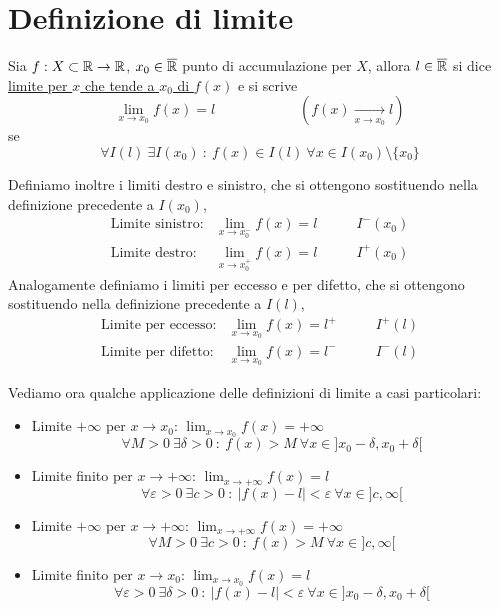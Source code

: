 \section{Definizione di limite}
\begin{boxdef}
    Sia $f:X\subset\mathbb{R}\to \mathbb{R}$, $x_0\in \overline{\mathbb{R}}$ punto di accumulazione per $X$, allora $l\in \overline{\mathbb{R}}$ si dice \underline{limite per $x$ che tende a $x_0$ di $f(x)$} e si scrive
    \[\lim_{x\to x_0}f(x) = l\qquad\qquad\qquad \left(f(x)\underset{x\to x_0}{\xrightarrow{\hspace{1cm}}}l\right)\]
    se
    \[\forall I(l)\ \exists I(x_0) \ :\ f(x)\in I(l)\ \forall x \in I(x_0)\setminus \{x_0\}\]
\end{boxdef}
Definiamo inoltre i limiti destro e sinistro, che si ottengono sostituendo nella definizione precedente a $I(x_0)$, 
\[\begin{array}{lll}
    \text{Limite sinistro:} & \lim_{x \to x_0^-}f(x) = l \qquad &I^-(x_0)\\
    \text{Limite destro:} & \lim_{x \to x_0^+}f(x) = l & I^ +(x_0)
\end{array}\]
Analogamente definiamo i limiti per eccesso e per difetto, che si ottengono sostituendo nella definizione precedente a $I(l)$, 
\[\begin{array}{lll}
    \text{Limite per eccesso:} & \lim_{x \to x_0}f(x) = l^+\qquad &I^ + (l)\\
    \text{Limite per difetto:} & \lim_{x \to x_0}f(x) = l^-  & I^ - (l)
\end{array}\]

Vediamo ora qualche applicazione delle definizioni di limite a casi particolari:
\begin{itemize}
    \item Limite $+\infty$ per $x\to x_0$: $\lim_{x\to x_0}f(x)=+\infty$
    \[\forall M > 0\ \exists \delta > 0\ :\ f(x) > M\ \forall x \in ] x_0 -\delta, x_0 +\delta[\]
    \item Limite finito per $x\to +\infty$: $\lim_{x\to +\infty}f(x)=l$
    \[\forall \varepsilon > 0\ \exists c > 0\ :\ |f(x) - l |< \varepsilon \ \forall x \in ] c, \infty[\]
    \item Limite $+\infty$ per $x\to +\infty$: $\lim_{x\to +\infty}f(x)=+\infty$
    \[\forall M > 0\ \exists c > 0\ :\ f(x) > M\ \forall x \in ] c,\infty[\]
    \item Limite finito per $x\to x_0$: $\lim_{x\to x_0}f(x)=l$
    \[\forall \varepsilon > 0\ \exists \delta > 0\ :\ |f(x) - l |< \varepsilon \ \forall x \in ] x_0 -\delta, x_0 + \delta[\]
\end{itemize}

